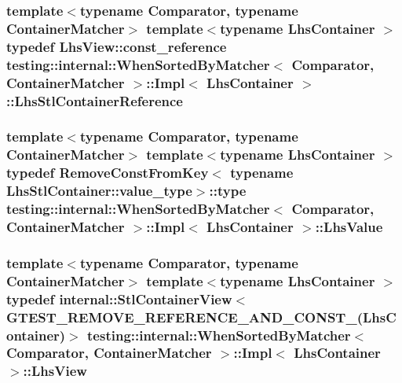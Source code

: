 \subsubsection[{\texorpdfstring{Lhs\+Stl\+Container\+Reference}{LhsStlContainerReference}}]{\setlength{\rightskip}{0pt plus 5cm}template$<$typename Comparator, typename Container\+Matcher$>$ template$<$typename Lhs\+Container $>$ typedef {\bf Lhs\+View\+::const\+\_\+reference} {\bf testing\+::internal\+::\+When\+Sorted\+By\+Matcher}$<$ Comparator, Container\+Matcher $>$\+::{\bf Impl}$<$ Lhs\+Container $>$\+::{\bf Lhs\+Stl\+Container\+Reference}}\hypertarget{classtesting_1_1internal_1_1_when_sorted_by_matcher_1_1_impl_ab5e53a762bb213ccf84299b31c825b58}{}\label{classtesting_1_1internal_1_1_when_sorted_by_matcher_1_1_impl_ab5e53a762bb213ccf84299b31c825b58}
\subsubsection[{\texorpdfstring{Lhs\+Value}{LhsValue}}]{\setlength{\rightskip}{0pt plus 5cm}template$<$typename Comparator, typename Container\+Matcher$>$ template$<$typename Lhs\+Container $>$ typedef {\bf Remove\+Const\+From\+Key}$<$ typename Lhs\+Stl\+Container\+::value\+\_\+type$>$\+::type {\bf testing\+::internal\+::\+When\+Sorted\+By\+Matcher}$<$ Comparator, Container\+Matcher $>$\+::{\bf Impl}$<$ Lhs\+Container $>$\+::{\bf Lhs\+Value}}\hypertarget{classtesting_1_1internal_1_1_when_sorted_by_matcher_1_1_impl_a93044f4ba53373fcfc424132b5e6c462}{}\label{classtesting_1_1internal_1_1_when_sorted_by_matcher_1_1_impl_a93044f4ba53373fcfc424132b5e6c462}
\subsubsection[{\texorpdfstring{Lhs\+View}{LhsView}}]{\setlength{\rightskip}{0pt plus 5cm}template$<$typename Comparator, typename Container\+Matcher$>$ template$<$typename Lhs\+Container $>$ typedef {\bf internal\+::\+Stl\+Container\+View}$<$ {\bf G\+T\+E\+S\+T\+\_\+\+R\+E\+M\+O\+V\+E\+\_\+\+R\+E\+F\+E\+R\+E\+N\+C\+E\+\_\+\+A\+N\+D\+\_\+\+C\+O\+N\+S\+T\+\_\+}(Lhs\+Container)$>$ {\bf testing\+::internal\+::\+When\+Sorted\+By\+Matcher}$<$ Comparator, Container\+Matcher $>$\+::{\bf Impl}$<$ Lhs\+Container $>$\+::{\bf Lhs\+View}}\hypertarget{classtesting_1_1internal_1_1_when_sorted_by_matcher_1_1_impl_a4c84fddfe1bf967a73e5dae1940db427}{}\label{classtesting_1_1internal_1_1_when_sorted_by_matcher_1_1_impl_a4c84fddfe1bf967a73e5dae1940db427}


